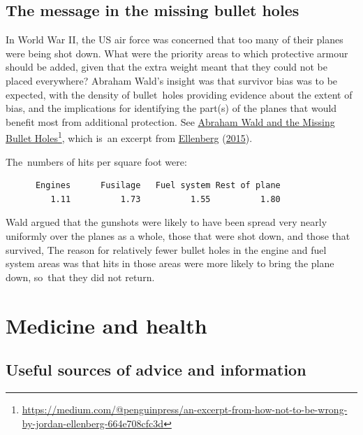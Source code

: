 \documentclass[
  10pt,
  b5paper]{book}
\begin{document}
\hypertarget{ss:wald}{%
\section{The message in the missing bullet holes}\label{ss:wald}}

In World War II, the US air force was concerned that too many
of their planes were being shot down. What were the priority
areas to which protective armour should be added, given that
the extra weight meant that they could not be placed everywhere?
Abraham Wald's insight was that survivor bias was to be
expected, with the density of bullet~holes providing evidence
about the extent of bias, and the implications for identifying
the part(s) of the planes that would benefit most from
additional protection. See \href{https://medium.com/@penguinpress/an-excerpt-from-how-not-to-be-wrong-by-jordan-ellenberg-664e708cfc3d}{Abraham Wald and the Missing Bullet Holes}\footnote{\url{https://medium.com/@penguinpress/an-excerpt-from-how-not-to-be-wrong-by-jordan-ellenberg-664e708cfc3d}},
which is~an excerpt from \protect\hyperlink{ref-ellenberg_2015}{Ellenberg} (\protect\hyperlink{ref-ellenberg_2015}{2015}).

The~numbers of hits per square foot were:

\begin{verbatim}
      Engines      Fusilage   Fuel system Rest of plane 
         1.11          1.73          1.55          1.80 
\end{verbatim}

Wald argued that the gunshots were likely to have been spread
very nearly uniformly over the planes as a whole, those that
were shot down, and those that survived, The reason for relatively
fewer bullet holes in the engine and fuel system areas was that
hits in those areas were more likely to bring the plane down,
so~that they did not return.

\hypertarget{medicine-and-health}{%
\chapter{Medicine and health}\label{medicine-and-health}}

\hypertarget{useful-sources-of-advice-and-information}{%
\section{Useful sources of advice and information}\label{useful-sources-of-advice-and-information}}
\end{document}
